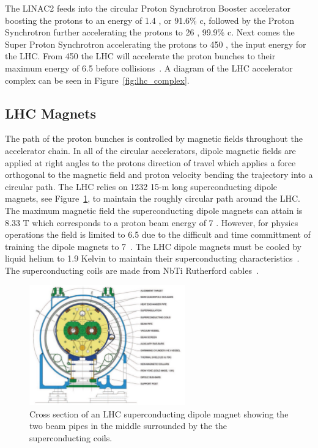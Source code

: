 The LINAC2 feeds into the circular Proton Synchrotron Booster accelerator boosting
the protons to an energy of 1.4 \GeV, or 91.6\% c, followed by the Proton Synchrotron further
accelerating the protons to 26 \GeV, 99.9\% c. Next comes the Super Proton Synchrotron
accelerating the protons to 450 \GeV, the input energy for the LHC. From 450 \GeV the LHC 
will accelerate the proton bunches to their maximum energy of 6.5 \TeV before 
collisions~\cite{Voss:2009zz}.
A diagram of the LHC accelerator complex can be seen in Figure~\ref{fig:lhc_complex}.



\subsection{LHC Magnets}
The path of the proton bunches is controlled by magnetic fields throughout
the accelerator chain. In all of the circular accelerators, dipole magnetic fields are applied
at right angles to the protons direction of travel which applies a force orthogonal to
the magnetic field and proton velocity bending the trajectory into a circular path. The LHC
relies on 1232 15-m long superconducting dipole magnets, see Figure~\ref{fig:lhc_dipole},
to maintain the roughly circular path around the LHC.
The maximum magnetic field the superconducting dipole magnets can attain is 8.33 T which
corresponds to a proton beam energy of 7 \TeV. However, for physics operations the field is limited to 
6.5 \TeV due to the difficult and time committment of training the dipole magnets to 7\TeV~\cite{7372416-ieee-dipole}.
The LHC dipole magnets must be cooled by liquid helium to 1.9 Kelvin to maintain their superconducting
characteristics~\cite{lhc_magnets}. The superconducting coils are made from NbTi Rutherford
cables~\cite{1018583}.

\begin{figure}[htbp]
\centering
     \includegraphics[width=0.6\textwidth]{cms_and_lhc/plots/lhc_dipole_cross_section.pdf}
     \caption{
Cross section of an LHC superconducting dipole magnet showing the two beam pipes in the middle
surrounded by the the superconducting coils.
     }
     \label{fig:lhc_dipole}
\end{figure}

